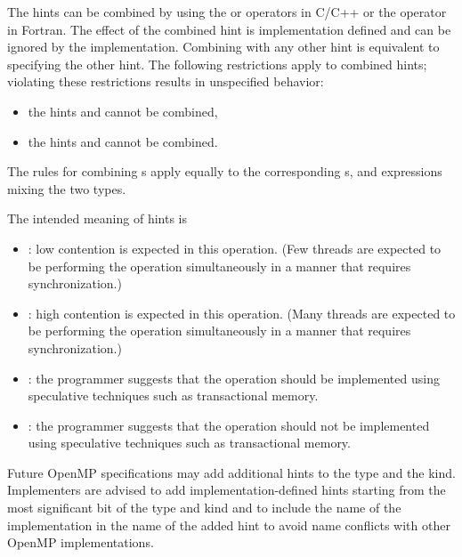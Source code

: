 The hints can be combined by using the \code{+} or \code{|} operators in C/C++ or the \code{+} operator in Fortran.  
The effect of the combined hint is implementation defined and can be ignored by the implementation.
Combining  with any other hint is equivalent to specifying the other hint.
The following restrictions apply to combined hints; violating these 
restrictions results in unspecified behavior:
\begin{itemize}
\item the hints  and  cannot be combined,
\item the hints  and  cannot be combined.
\end{itemize}
The rules for combining s apply equally to the
corresponding s, and expressions mixing the two types.

The intended meaning of hints is
\begin{itemize}
\item {}: low contention is expected in this operation.
(Few threads are expected to be performing the operation simultaneously in a manner that requires synchronization.)
\item {}: high contention is expected in this operation.
(Many threads are expected to be performing the operation simultaneously in a manner that requires synchronization.)
\item {}: the programmer suggests that the operation should be implemented using
speculative techniques such as transactional memory.
\item {}: the programmer suggests that the operation should not be
implemented using speculative techniques such as transactional memory.
\end{itemize}

\begin{note}
Future OpenMP specifications may add additional hints to the
 type and the  kind.
Implementers are advised to add implementation-defined hints starting from
the most significant bit of the  type and
 kind and to include the name of the
implementation in the name of the added hint to avoid name conflicts
with other OpenMP implementations.
\end{note}

